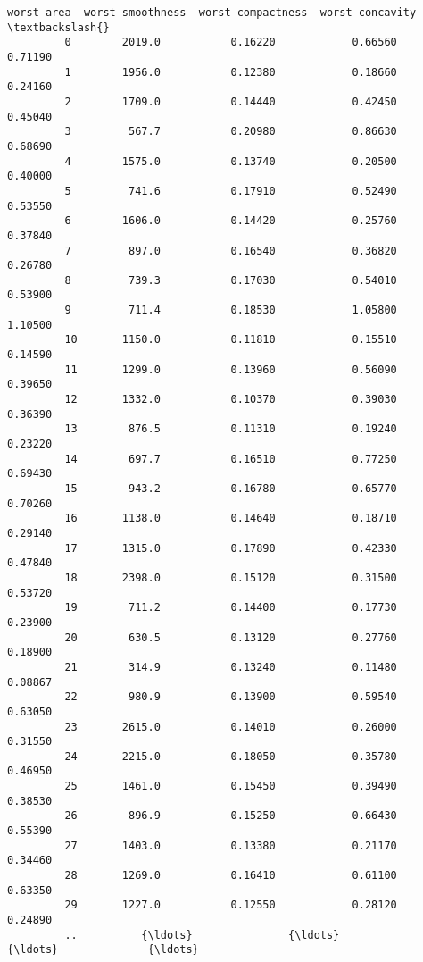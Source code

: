\documentclass[11pt]{article}
\begin{document}
\begin{Verbatim}[commandchars=\\\{\}]
              worst area  worst smoothness  worst compactness  worst concavity  \textbackslash{}
         0        2019.0           0.16220            0.66560          0.71190   
         1        1956.0           0.12380            0.18660          0.24160   
         2        1709.0           0.14440            0.42450          0.45040   
         3         567.7           0.20980            0.86630          0.68690   
         4        1575.0           0.13740            0.20500          0.40000   
         5         741.6           0.17910            0.52490          0.53550   
         6        1606.0           0.14420            0.25760          0.37840   
         7         897.0           0.16540            0.36820          0.26780   
         8         739.3           0.17030            0.54010          0.53900   
         9         711.4           0.18530            1.05800          1.10500   
         10       1150.0           0.11810            0.15510          0.14590   
         11       1299.0           0.13960            0.56090          0.39650   
         12       1332.0           0.10370            0.39030          0.36390   
         13        876.5           0.11310            0.19240          0.23220   
         14        697.7           0.16510            0.77250          0.69430   
         15        943.2           0.16780            0.65770          0.70260   
         16       1138.0           0.14640            0.18710          0.29140   
         17       1315.0           0.17890            0.42330          0.47840   
         18       2398.0           0.15120            0.31500          0.53720   
         19        711.2           0.14400            0.17730          0.23900   
         20        630.5           0.13120            0.27760          0.18900   
         21        314.9           0.13240            0.11480          0.08867   
         22        980.9           0.13900            0.59540          0.63050   
         23       2615.0           0.14010            0.26000          0.31550   
         24       2215.0           0.18050            0.35780          0.46950   
         25       1461.0           0.15450            0.39490          0.38530   
         26        896.9           0.15250            0.66430          0.55390   
         27       1403.0           0.13380            0.21170          0.34460   
         28       1269.0           0.16410            0.61100          0.63350   
         29       1227.0           0.12550            0.28120          0.24890   
         ..          {\ldots}               {\ldots}                {\ldots}              {\ldots}   

\end{Verbatim}
\end{document}

